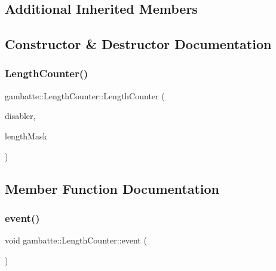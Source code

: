 \subsection*{Additional Inherited Members}


\subsection{Constructor \& Destructor Documentation}
\mbox{\label{classgambatte_1_1LengthCounter_aa654f8aecadd8f7f6c1896cc0fa23592}} 
\subsubsection{\texorpdfstring{Length\+Counter()}{LengthCounter()}}
{\footnotesize\ttfamily gambatte\+::\+Length\+Counter\+::\+Length\+Counter (\begin{DoxyParamCaption}\item[{\hyperlink{classgambatte_1_1MasterDisabler}{Master\+Disabler} \&}]{disabler,  }\item[{unsigned}]{length\+Mask }\end{DoxyParamCaption})}



\subsection{Member Function Documentation}
\mbox{\label{classgambatte_1_1LengthCounter_ab0d3eda374d487f8a0b79ea447cca91a}} 
\subsubsection{\texorpdfstring{event()}{event()}}
{\footnotesize\ttfamily void gambatte\+::\+Length\+Counter\+::event (\begin{DoxyParamCaption}{ }\end{DoxyParamCaption})\hspace{0.3cm}{\ttfamily [virtual]}}



